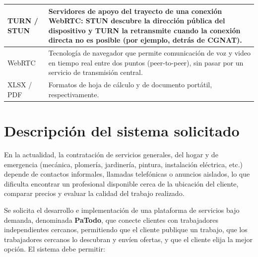 \documentclass[doc,12pt,a4paper]{apa7}
\begin{document}
\begin{longtable}{|P{3.3cm}|L{11.2cm}|}
TURN / STUN & Servidores de apoyo del trayecto de una conexión WebRTC: STUN descubre la dirección pública del dispositivo y TURN la retransmite cuando la conexión directa no es posible (por ejemplo, detrás de CGNAT). \\ \hline

WebRTC & Tecnología de navegador que permite comunicación de voz y video en tiempo real entre dos puntos (peer-to-peer), sin pasar por un servicio de transmisión central. \\ \hline

XLSX / PDF & Formatos de hoja de cálculo y de documento portátil, respectivamente. \\ \hline
\end{longtable}

\section{Descripción del sistema solicitado}

En la actualidad, la contratación de servicios generales, del hogar y de emergencia (mecánica, plomería, jardinería, pintura, instalación eléctrica, etc.) depende de contactos informales, llamadas telefónicas o anuncios aislados, lo que dificulta encontrar un profesional disponible cerca de la ubicación del cliente, comparar precios y evaluar la calidad del trabajo realizado.

Se solicita el desarrollo e implementación de una plataforma de servicios bajo demanda, denominada \textbf{PaTodo}, que conecte clientes con trabajadores independientes cercanos, permitiendo que el cliente publique un trabajo, que los trabajadores cercanos lo descubran y envíen ofertas, y que el cliente elija la mejor opción. El sistema debe permitir:
\end{document}
